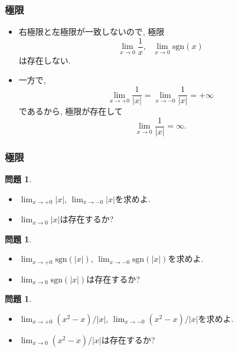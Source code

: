 \documentclass[dvipdfmx,cjk,10.2pt]{beamer}
\theoremstyle{definition}
\newtheorem{Prob}[Thm]{問題}
\begin{document}
\begin{frame}
\frametitle{極限} 


\begin{itemize}
\item 右極限と左極限が一致しないので, 極限
$$
\lim_{x\to 0}\frac{1}{x}, \ \ \ \lim_{x\to0}\mathrm{sgn}(x)
$$
は存在しない. 
\item 一方で, 
$$
\lim_{x\to +0}\frac{1}{|x|}=\lim_{x\to -0}\frac{1}{|x|}=+\infty
$$
であるから, 極限が存在して
$$
\lim_{x\to 0}\frac{1}{|x|}=\infty. 
$$
\end{itemize}

\end{frame}




\begin{frame}
\frametitle{極限} 



\begin{Prob}
\begin{itemize}
\item $\displaystyle \lim_{x\to +0}|x|$, $\displaystyle \lim_{x\to -0}|x|$を求めよ. 
\item $\displaystyle \lim_{x\to0}|x|$は存在するか? 
\end{itemize}
\end{Prob}


\begin{Prob}
\begin{itemize}
\item $\displaystyle \lim_{x\to +0}\mathrm{sgn}(|x|)$,  $\displaystyle \lim_{x\to -0}\mathrm{sgn}(|x|)$を求めよ. 
\item $\displaystyle \lim_{x\to 0}\mathrm{sgn}(|x|)$は存在するか? 
\end{itemize}
\end{Prob}

\begin{Prob}
\begin{itemize}
\item $\displaystyle \lim_{x\to +0}(x^2-x)/|x|$,   $\displaystyle \lim_{x\to -0}(x^2-x)/|x|$を求めよ. 
\item $\displaystyle \lim_{x\to 0} (x^2-x)/|x|$は存在するか? 
\end{itemize}
\end{Prob}

\end{frame}
\end{document}
